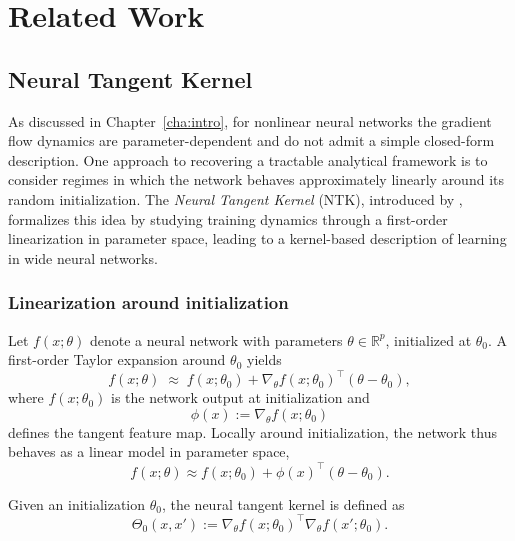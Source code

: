 \chapter{\label{cha:related}Related Work}

\section{Neural Tangent Kernel}\label{sec:ntk}

As discussed in Chapter~\ref{cha:intro}, for nonlinear neural networks the
gradient flow dynamics are parameter-dependent and do not admit a simple
closed-form description. One approach to recovering a tractable analytical
framework is to consider regimes in which the network behaves approximately
linearly around its random initialization. The \emph{Neural Tangent Kernel}
(NTK), introduced by \citet{jacot2018ntk}, formalizes this idea by studying
training dynamics through a first-order linearization in parameter space,
leading to a kernel-based description of learning in wide neural networks.

\subsection{Linearization around initialization}

Let $f(x;\theta)$ denote a neural network with parameters
$\theta \in \mathbb{R}^p$, initialized at $\theta_0$. A first-order Taylor
expansion around $\theta_0$ yields
\begin{equation}
	f(x;\theta)
	\;\approx\;
	f(x;\theta_0)
	+
	\nabla_\theta f(x;\theta_0)^\top (\theta - \theta_0),
	\label{eq:ntk-linearization}
\end{equation}
where $f(x;\theta_0)$ is the network output at initialization and
\[
	\phi(x) := \nabla_\theta f(x;\theta_0)
\]
defines the tangent feature map. Locally around initialization, the network
thus behaves as a linear model in parameter space,
\begin{equation}
	f(x;\theta) \approx f(x;\theta_0) + \phi(x)^\top (\theta - \theta_0).
	\label{eq:ntk-linear-model}
\end{equation}

\begin{definition}
	Given an initialization $\theta_0$, the neural tangent kernel is defined as
	\[
		\Theta_0(x,x')
		:= \nabla_\theta f(x;\theta_0)^\top
		\nabla_\theta f(x';\theta_0).
	\]
\end{definition}

